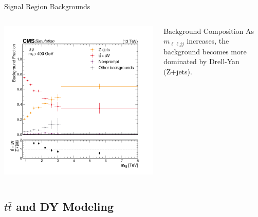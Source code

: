 \documentclass[aspectratio=169]{beamer}
\begin{document}
\begin{frame}{Signal Region Backgrounds}
  \begin{columns}
    \begin{column}{0.50\textwidth}
      \centering
      \includegraphics[width=\textwidth]{../figures/plots/sr-bkg-frac-mumu.png}
    \end{column}
    \begin{column}{0.50\textwidth}
        \vspace*{-15mm}
        \centering
        \resizebox{\columnwidth}{!}{%
        }
      \vspace{1ex} 
      \begin{block}{Background Composition}
        As $m_{\ell\ell jj}$ increases, the background becomes more dominated by Drell-Yan (Z+jets).
      \end{block}
    \end{column}
  \end{columns}
\end{frame}

\subsection{$t\bar{t}$ and DY Modeling}
\end{document}
